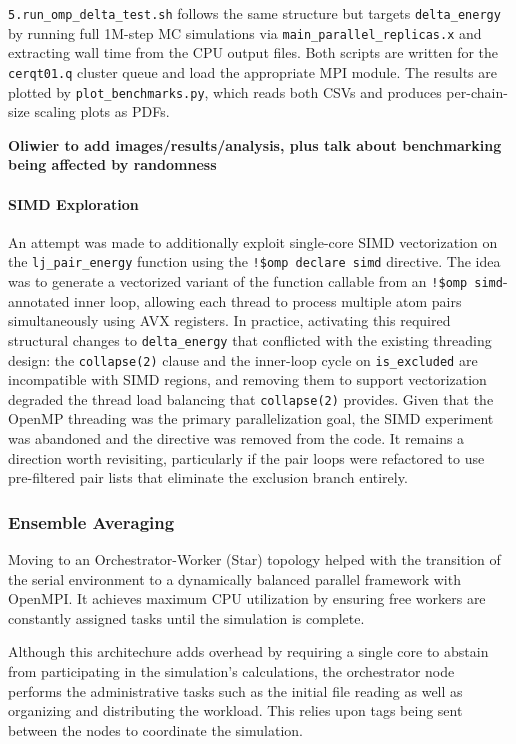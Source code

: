 \documentclass[
]{article}
\begin{document}
\texttt{5.run\_omp\_delta\_test.sh} follows the same structure but
targets \texttt{delta\_energy} by running full 1M-step MC simulations
via \texttt{main\_parallel\_replicas.x} and extracting wall time from
the CPU output files. Both scripts are written for the
\texttt{cerqt01.q} cluster queue and load the appropriate MPI module.
The results are plotted by \texttt{plot\_benchmarks.py}, which reads
both CSVs and produces per-chain-size scaling plots as PDFs.

\textbf{Oliwier to add images/results/analysis, plus talk about
benchmarking being affected by randomness}

\paragraph{SIMD Exploration}\label{simd-exploration}

An attempt was made to additionally exploit single-core SIMD
vectorization on the \texttt{lj\_pair\_energy} function using the
\texttt{!\$omp\ declare\ simd} directive. The idea was to generate a
vectorized variant of the function callable from an
\texttt{!\$omp\ simd}-annotated inner loop, allowing each thread to
process multiple atom pairs simultaneously using AVX registers. In
practice, activating this required structural changes to
\texttt{delta\_energy} that conflicted with the existing threading
design: the \texttt{collapse(2)} clause and the inner-loop cycle on
\texttt{is\_excluded} are incompatible with SIMD regions, and removing
them to support vectorization degraded the thread load balancing that
\texttt{collapse(2)} provides. Given that the OpenMP threading was the
primary parallelization goal, the SIMD experiment was abandoned and the
directive was removed from the code. It remains a direction worth
revisiting, particularly if the pair loops were refactored to use
pre-filtered pair lists that eliminate the exclusion branch entirely.

\subsubsection{Ensemble Averaging}\label{ensemble-averaging}

Moving to an Orchestrator-Worker (Star) topology helped with the
transition of the serial environment to a dynamically balanced parallel
framework with OpenMPI. It achieves maximum CPU utilization by ensuring
free workers are constantly assigned tasks until the simulation is
complete.

Although this architechure adds overhead by requiring a single core to
abstain from participating in the simulation's calculations, the
orchestrator node performs the administrative tasks such as the initial
file reading as well as organizing and distributing the workload. This
relies upon tags being sent between the nodes to coordinate the
simulation.
\end{document}

